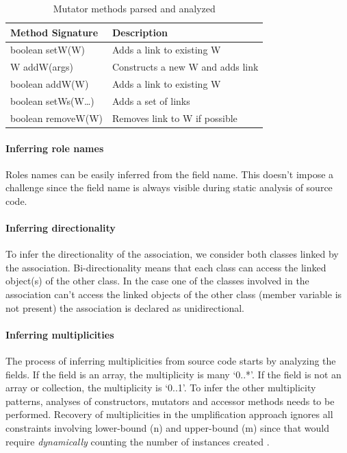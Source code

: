 \begin{table}
\caption{Mutator methods parsed and analyzed}
\label{table:mutators}
\centering
    \begin{tabular}{ll}
		\toprule
		\rowcolor[HTML]{BBDAFF}
        \textbf{Method Signature}   & \textbf{Description}    \\ 
        \hline
        boolean setW(W)   & Adds a link to existing W   		\\ 
        W addW(args)    & Constructs a new W and adds link      \\ 
        boolean addW(W)  & Adds a link to existing W            \\ 
        boolean setWs(W…)    & Adds a set of links              \\ 
        boolean removeW(W) &   Removes link to W if possible    \\
        \hline
    \end{tabular}
\end{table}

\paragraph*{Inferring role names}

Roles names can be easily inferred from the field name. This doesn't impose a challenge since the field name is always visible during static analysis of source code.

\paragraph*{Inferring directionality}

To infer the directionality of the association, we consider both classes linked by the association. Bi-directionality means that each class can access the linked object(s) of the other class. In the case one of the classes involved in the association can't access the linked objects of the other class (member variable is not present) the association is declared as unidirectional.

\paragraph*{Inferring multiplicities}

The process of inferring multiplicities from source code starts by analyzing the fields. If the field is an array, the multiplicity is many `0..*'. If the field is not an array or collection, the multiplicity is `0..1'. To infer the other multiplicity patterns, analyses of constructors, mutators and accessor methods needs to be performed. Recovery of multiplicities in the umplification approach ignores all constraints involving lower-bound (n) and upper-bound (m) since that would require \textit{dynamically} counting the number of instances created \cite{Kollmann2001}.

